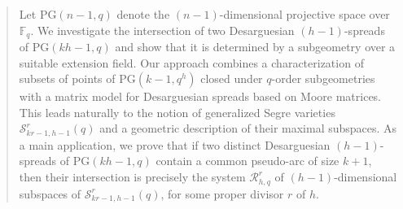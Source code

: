 \documentclass[11pt]{article}
\theoremstyle{definition}
\numberwithin{equation}{section}
\def\cR{\mathcal R}
\def\PG{\mathrm{PG}}
\def\F{{\mathbb F}}
\begin{document}



\begin{abstract}
Let $\PG(n-1,q)$ denote the $(n-1)$-dimensional projective space over $\F_q$. We investigate the intersection of two Desarguesian $(h-1)$-spreads of $\PG(kh-1,q)$ and show that it is determined by a subgeometry over a suitable extension field. Our approach combines a characterization of subsets of points of $\PG(k-1,q^h)$ closed under $q$-order subgeometries with a matrix model for Desarguesian spreads based on Moore matrices. This leads naturally to the notion of generalized Segre varieties $\mathcal S^r_{kr-1,h-1}(q)$ and a geometric description of their maximal subspaces. As a main application, we prove that if two distinct Desarguesian $(h-1)$-spreads of $\PG(kh-1,q)$ contain a common pseudo-arc of size $k+1$, then their intersection is precisely the system $\cR^r_{h,q}$ of $(h-1)$-dimensional subspaces of $\mathcal S^r_{kr-1,h-1}(q)$, for some proper divisor $r$ of $h$.
\end{abstract}
\end{document}
